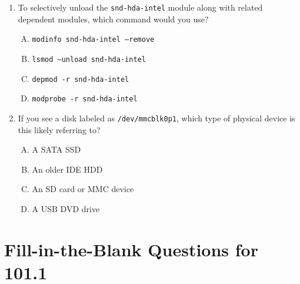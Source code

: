 \documentclass[12pt,a4paper]{report}
\begin{document}
\begin{enumerate}[1.]
\item To selectively unload the \texttt{snd-hda-intel} module along with related dependent modules, which command would you use?
  \begin{enumerate}[A)]
    \item \texttt{modinfo snd-hda-intel --remove}
    \item \texttt{lsmod --unload snd-hda-intel}
    \item \texttt{depmod -r snd-hda-intel}
    \item \texttt{modprobe -r snd-hda-intel}
  \end{enumerate}

\item If you see a disk labeled as \texttt{/dev/mmcblk0p1}, which type of physical device is this likely referring to?
  \begin{enumerate}[A)]
    \item A SATA SSD
    \item An older IDE HDD
    \item An SD card or MMC device
    \item A USB DVD drive
  \end{enumerate}
\end{enumerate}

\section*{Fill-in-the-Blank Questions for 101.1}
\end{document}
